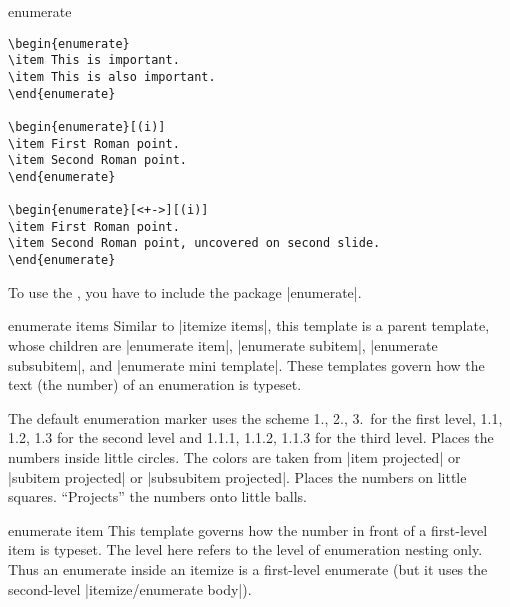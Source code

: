\begin{environment}{{enumerate}}
  \example
\begin{verbatim}
\begin{enumerate}
\item This is important.
\item This is also important.
\end{enumerate}

\begin{enumerate}[(i)]
\item First Roman point.
\item Second Roman point.
\end{enumerate}

\begin{enumerate}[<+->][(i)]
\item First Roman point.
\item Second Roman point, uncovered on second slide.
\end{enumerate}
\end{verbatim}

  \articlenote
  To use the , you have to include the package |enumerate|.

  \begin{element}{enumerate items}\semiyes\no\no
    Similar to |itemize items|, this template is a parent template, whose children are |enumerate item|, |enumerate subitem|, |enumerate subsubitem|, and |enumerate mini template|. These templates govern how the text (the number) of an enumeration is typeset.

    \begin{templateoptions}
      The default enumeration marker uses the scheme 1., 2., 3.\ for the first level, 1.1, 1.2, 1.3 for the second level and 1.1.1, 1.1.2, 1.1.3 for the third level.
      Places the numbers inside little circles. The colors are taken from |item projected| or |subitem projected| or |subsubitem projected|.
      Places the numbers on little squares.
      ``Projects'' the numbers onto little balls.
    \end{templateoptions}
  \end{element}

  \begin{element}{enumerate item}\yes\yes\yes
    This template governs how the number in front of a first-level item is typeset. The level here refers to the level of enumeration nesting only. Thus an enumerate inside an itemize is a first-level enumerate (but it uses the second-level |itemize/enumerate body|).


\end{element}
\end{environment}
